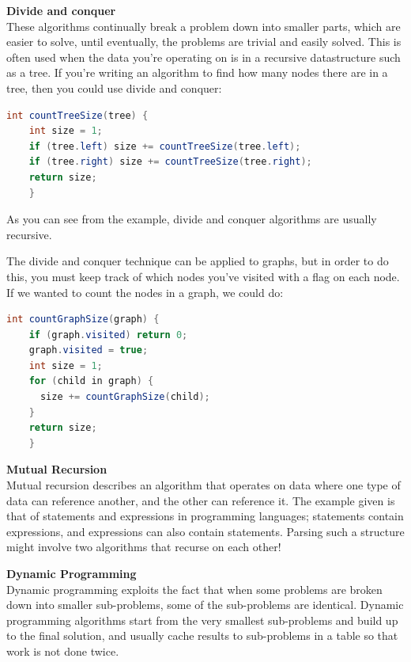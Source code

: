 \begin{description}
  \item \textbf{Divide and conquer}\\
  These algorithms continually break a problem down into smaller parts, which
  are easier to solve, until eventually, the problems are trivial and easily
  solved. This is often used when the data you're operating on is in a
  recursive datastructure such as a tree. If you're writing an algorithm to
  find how many nodes there are in a tree, then you could use divide and
  conquer:

  \begin{lstlisting}[language=java]
    int countTreeSize(tree) {
    int size = 1;
    if (tree.left) size += countTreeSize(tree.left);
    if (tree.right) size += countTreeSize(tree.right);
    return size;
    }
  \end{lstlisting}

  As you can see from the example, divide and conquer algorithms are usually
  recursive.

  The divide and conquer technique can be applied to graphs, but in order to
  do this, you must keep track of which nodes you've visited with a flag on
  each node. If we wanted to count the nodes in a graph, we could do:

  \begin{lstlisting}[language=java]
    int countGraphSize(graph) {
    if (graph.visited) return 0;
    graph.visited = true;
    int size = 1;
    for (child in graph) {
      size += countGraphSize(child);
    }
    return size;
    }
  \end{lstlisting}

  \item \textbf{Mutual Recursion}\\
  Mutual recursion describes an algorithm that operates on data where one type
  of data can reference another, and the other can reference it. The example
  given is that of statements and expressions in programming languages;
  statements contain expressions, and expressions can also contain statements.
  Parsing such a structure might involve two algorithms that recurse on each
  other!

  \item \textbf{Dynamic Programming}\\
  Dynamic programming exploits the fact that when some problems are broken
  down into smaller sub-problems, some of the sub-problems are identical.
  Dynamic programming algorithms start from the very smallest sub-problems and
  build up to the final solution, and usually cache results to sub-problems in
  a table so that work is not done twice.

\end{description}

